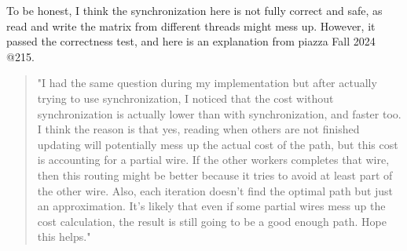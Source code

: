 \documentclass[letterpaper,11pt]{exam}
\begin{document}
\begin{questions}
    To be honest, I think the synchronization here is not fully correct and safe, as read and write the matrix from different threads might mess up.
    However, it passed the correctness test, and here is an explanation from piazza Fall 2024 @215. \\

    \begin{quote}
        \hspace{-1.0cm} "I had the same question during my implementation but after actually trying to use synchronization, I noticed that the cost without synchronization is actually lower than with synchronization, and faster too. I think the reason is that yes, reading when others are not finished updating will potentially mess up the actual cost of the path, but this cost is accounting for a partial wire. If the other workers completes that wire, then this routing might be better because it tries to avoid at least part of the other wire. Also, each iteration doesn't find the optimal path but just an approximation. It's likely that even if some partial wires mess up the cost calculation, the result is still going to be a good enough path. Hope this helps."
    \end{quote}
    \newpage




\end{questions}
\end{document}
